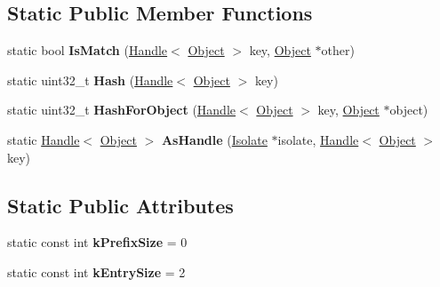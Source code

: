\subsection*{Static Public Member Functions}
\begin{DoxyCompactItemize}
\item 
\hypertarget{classv8_1_1internal_1_1_object_hash_table_shape_ac94f485cf9e0b2b96b9eb815bcabae44}{}static bool {\bfseries Is\+Match} (\hyperlink{classv8_1_1internal_1_1_handle}{Handle}$<$ \hyperlink{classv8_1_1internal_1_1_object}{Object} $>$ key, \hyperlink{classv8_1_1internal_1_1_object}{Object} $\ast$other)\label{classv8_1_1internal_1_1_object_hash_table_shape_ac94f485cf9e0b2b96b9eb815bcabae44}

\item 
\hypertarget{classv8_1_1internal_1_1_object_hash_table_shape_a026409866e62f58f5470550515a41d28}{}static uint32\+\_\+t {\bfseries Hash} (\hyperlink{classv8_1_1internal_1_1_handle}{Handle}$<$ \hyperlink{classv8_1_1internal_1_1_object}{Object} $>$ key)\label{classv8_1_1internal_1_1_object_hash_table_shape_a026409866e62f58f5470550515a41d28}

\item 
\hypertarget{classv8_1_1internal_1_1_object_hash_table_shape_a55d31c48863fe7ac61ef113a7bd4ad6d}{}static uint32\+\_\+t {\bfseries Hash\+For\+Object} (\hyperlink{classv8_1_1internal_1_1_handle}{Handle}$<$ \hyperlink{classv8_1_1internal_1_1_object}{Object} $>$ key, \hyperlink{classv8_1_1internal_1_1_object}{Object} $\ast$object)\label{classv8_1_1internal_1_1_object_hash_table_shape_a55d31c48863fe7ac61ef113a7bd4ad6d}

\item 
\hypertarget{classv8_1_1internal_1_1_object_hash_table_shape_a8a31033c7676afe1bb362bd48e38ab49}{}static \hyperlink{classv8_1_1internal_1_1_handle}{Handle}$<$ \hyperlink{classv8_1_1internal_1_1_object}{Object} $>$ {\bfseries As\+Handle} (\hyperlink{classv8_1_1internal_1_1_isolate}{Isolate} $\ast$isolate, \hyperlink{classv8_1_1internal_1_1_handle}{Handle}$<$ \hyperlink{classv8_1_1internal_1_1_object}{Object} $>$ key)\label{classv8_1_1internal_1_1_object_hash_table_shape_a8a31033c7676afe1bb362bd48e38ab49}

\end{DoxyCompactItemize}
\subsection*{Static Public Attributes}
\begin{DoxyCompactItemize}
\item 
\hypertarget{classv8_1_1internal_1_1_object_hash_table_shape_aa9507cf40bf2390bcffdf347c8fc26a2}{}static const int {\bfseries k\+Prefix\+Size} = 0\label{classv8_1_1internal_1_1_object_hash_table_shape_aa9507cf40bf2390bcffdf347c8fc26a2}

\item 
\hypertarget{classv8_1_1internal_1_1_object_hash_table_shape_ae2fbbf6aa03504427fe4bb77279d3f4f}{}static const int {\bfseries k\+Entry\+Size} = 2\label{classv8_1_1internal_1_1_object_hash_table_shape_ae2fbbf6aa03504427fe4bb77279d3f4f}

\end{DoxyCompactItemize}



